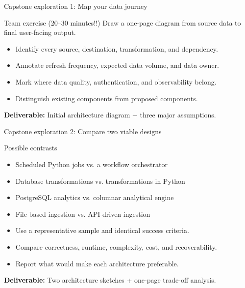 \documentclass[aspectratio=43,10pt]{beamer}
\begin{document}
\begin{frame}{Capstone exploration 1: Map your data journey}
\begin{block}{Team exercise (20--30 minutes!!)}
Draw a one-page diagram from source data to final user-facing output.
\end{block}
\begin{itemize}
  \item Identify every source, destination, transformation, and dependency.
  \item Annotate refresh frequency, expected data volume, and data owner.
  \item Mark where data quality, authentication, and observability belong.
  \item Distinguish existing components from proposed components.
\end{itemize}

\medskip
\textbf{Deliverable:} Initial architecture diagram + three major assumptions.
\end{frame}

\begin{frame}{Capstone exploration 2: Compare two viable designs}
\begin{block}{Possible contrasts}
\begin{itemize}
  \item Scheduled Python jobs vs. a workflow orchestrator
  \item Database transformations vs. transformations in Python
  \item PostgreSQL analytics vs. columnar analytical engine
  \item File-based ingestion vs. API-driven ingestion
\end{itemize}
\end{block}
\begin{itemize}
  \item Use a representative sample and identical success criteria.
  \item Compare correctness, runtime, complexity, cost, and recoverability.
  \item Report what would make each architecture preferable.
\end{itemize}

\medskip
\textbf{Deliverable:} Two architecture sketches + one-page trade-off analysis.
\end{frame}
\end{document}
